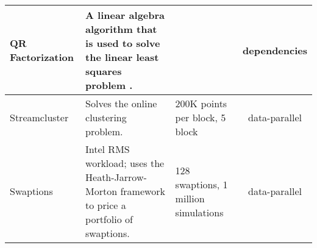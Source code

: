 \begin{table*}[h]
\begin{tabular}{|p{2cm}|p{5.7cm}|p{4.5cm}|c|}
	QR Factorization & A linear algebra algorithm that is used to solve the linear least squares problem \cite{QR}.& \kc{multiple} & dependencies \\ \hline
	Streamcluster & Solves the online clustering problem. & 200K points per block, 5 block & 
data-parallel\\ \hline
	Swaptions & Intel RMS workload; uses the Heath-Jarrow-Morton framework to price a portfolio of swaptions. & 128 swaptions, 1 million  simulations & data-parallel\\ \hline
	\end{tabular}
	\label{tab:parsec}
\end{table*}
